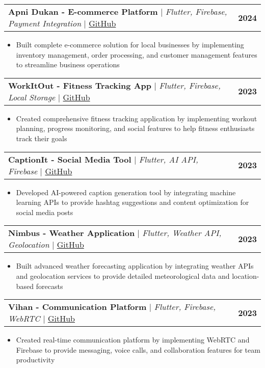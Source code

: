 \documentclass[a4paper,11pt]{article}
\makeatletter
\newcommand{\resumeItem}[1]{
  \item\small{
    {#1 \vspace{-2pt}}
  }
}
\newcommand{\resumeProjectHeading}[2]{
    \item
    \begin{tabular*}{1.001\textwidth}{l@{\extracolsep{\fill}}r}
      \small#1 & \textbf{\small #2}\\
    \end{tabular*}\vspace{-7pt}
}
\newcommand{\resumeItemListStart}{\begin{itemize}}
\newcommand{\resumeItemListEnd}{\end{itemize}\vspace{-5pt}}
\makeatother
\begin{document}
      \resumeProjectHeading
          {\textbf{Apni Dukan - E-commerce Platform} $|$ \emph{Flutter, Firebase, Payment Integration} $|$ \href{https://github.com/suraj-yadav0/apna_kiryana}{GitHub}}{2024}
          \resumeItemListStart
            \resumeItem{Built complete e-commerce solution for local businesses by implementing inventory management, order processing, and customer management features to streamline business operations}
          \resumeItemListEnd 
          \vspace{-13pt}
          
      \resumeProjectHeading
          {\textbf{WorkItOut - Fitness Tracking App} $|$ \emph{Flutter, Firebase, Local Storage} $|$ \href{https://github.com/suraj-yadav0/work_it_out}{GitHub}}{2023}
          \resumeItemListStart
            \resumeItem{Created comprehensive fitness tracking application by implementing workout planning, progress monitoring, and social features to help fitness enthusiasts track their goals}
          \resumeItemListEnd 
          \vspace{-13pt}
          
      \resumeProjectHeading
          {\textbf{CaptionIt - Social Media Tool} $|$ \emph{Flutter, AI API, Firebase} $|$ \href{https://github.com/suraj-yadav0/caption_it}{GitHub}}{2023}
          \resumeItemListStart
            \resumeItem{Developed AI-powered caption generation tool by integrating machine learning APIs to provide hashtag suggestions and content optimization for social media posts}
          \resumeItemListEnd 
          \vspace{-13pt}
          
      \resumeProjectHeading
          {\textbf{Nimbus - Weather Application} $|$ \emph{Flutter, Weather API, Geolocation} $|$ \href{https://github.com/suraj-yadav0/nimbus}{GitHub}}{2023}
          \resumeItemListStart
            \resumeItem{Built advanced weather forecasting application by integrating weather APIs and geolocation services to provide detailed meteorological data and location-based forecasts}
          \resumeItemListEnd 
          \vspace{-13pt}
          
      \resumeProjectHeading
          {\textbf{Vihan - Communication Platform} $|$ \emph{Flutter, Firebase, WebRTC} $|$ \href{https://github.com/suraj-yadav0/vihan}{GitHub}}{2023}
          \resumeItemListStart
            \resumeItem{Created real-time communication platform by implementing WebRTC and Firebase to provide messaging, voice calls, and collaboration features for team productivity}
          \resumeItemListEnd 
          
\end{document}
